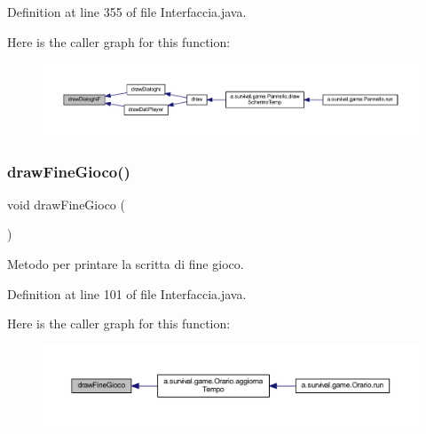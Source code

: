 Definition at line 355 of file Interfaccia.\+java.

Here is the caller graph for this function\+:
\nopagebreak
\begin{figure}[H]
\begin{center}
\leavevmode
\includegraphics[width=350pt]{classa_1_1survival_1_1game_1_1_interfaccia_a73a0c3b24b1d27132d84f43de7262e36_icgraph}
\end{center}
\end{figure}
\mbox{\label{classa_1_1survival_1_1game_1_1_interfaccia_afb3918edf3e2da123a3585258d5c5045}} 
\subsubsection{\texorpdfstring{draw\+Fine\+Gioco()}{drawFineGioco()}}
{\footnotesize\ttfamily void draw\+Fine\+Gioco (\begin{DoxyParamCaption}{ }\end{DoxyParamCaption})}



Metodo per printare la scritta di fine gioco. 



Definition at line 101 of file Interfaccia.\+java.

Here is the caller graph for this function\+:
\nopagebreak
\begin{figure}[H]
\begin{center}
\leavevmode
\includegraphics[width=350pt]{classa_1_1survival_1_1game_1_1_interfaccia_afb3918edf3e2da123a3585258d5c5045_icgraph}
\end{center}
\end{figure}
\mbox{\label{classa_1_1survival_1_1game_1_1_interfaccia_aeb2c7e9c7d14c9eccb7e624bd9611ef8}} 
